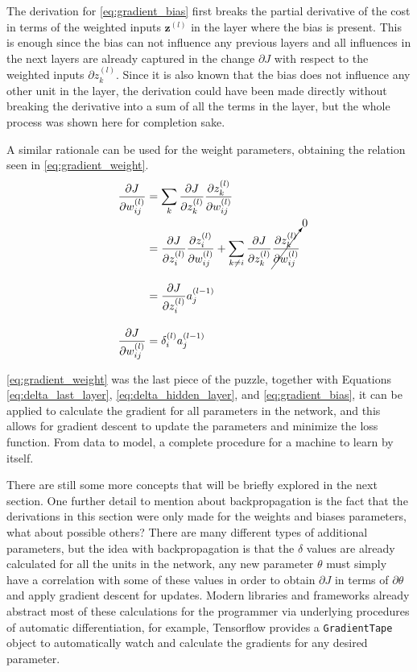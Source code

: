 The derivation for \autoref{eq:gradient_bias} first breaks the partial derivative of the cost in terms of the weighted inputs $\bm{z}^{(l)}$ in the layer where the bias is present. This is enough since the bias can not influence any previous layers and all influences in the next layers are already captured in the change $\partial J$ with respect to the weighted inputs $\partial z_k^{(l)}$. Since it is also known that the bias does not influence any other unit in the layer, the derivation could have been made directly without breaking the derivative into a sum of all the terms in the layer, but the whole process was shown here for completion sake.

A similar rationale can be used for the weight parameters, obtaining the relation seen in \autoref{eq:gradient_weight}.
\begin{align}
    \frac{\partial J}{\partial w_{ij}^{(l)}} &= \sum_{k}{
        \frac{\partial J}{\partial z_k^{(l)}}
        \frac{\partial z_k^{(l)}}{\partial w_{ij}^{(l)}}
    } \nonumber \\
    &= \frac{\partial J}{\partial z_i^{(l)}} \frac{\partial z_i^{(l)}}{\partial w_{ij}^{(l)}} + 
    \sum_{k \neq i}{
        \frac{\partial J}{\partial z_k^{(l)}}
        \cancelto{0}{\frac{\partial z_k^{(l)}}{\partial w_{ij}^{(l)}}}
    } \nonumber \\[10pt]
    &= \frac{\partial J}{\partial z_i^{(l)}} a_{j}^{(l-1)} \nonumber \\[10pt]
    \frac{\partial J}{\partial w_{ij}^{(l)}} &= \delta_{i}^{(l)} a_{j}^{(l-1)} \label{eq:gradient_weight}
\end{align}


\autoref{eq:gradient_weight} was the last piece of the puzzle, together with Equations \ref{eq:delta_last_layer}, \ref{eq:delta_hidden_layer}, and \ref{eq:gradient_bias}, it can be applied to calculate the gradient for all parameters in the network, and this allows for gradient descent to update the parameters and minimize the loss function. From data to model, a complete procedure for a machine to learn by itself.

There are still some more concepts that will be briefly explored in the next section. One further detail to mention about backpropagation is the fact that the derivations in this section were only made for the weights and biases parameters, what about possible others? There are many different types of additional parameters, but the idea with backpropagation is that the $\delta$ values are already calculated for all the units in the network, any new parameter $\theta$ must simply have a correlation with some of these values in order to obtain $\partial J$ in terms of $\partial\theta$ and apply gradient descent for updates. Modern libraries and frameworks already abstract most of these calculations for the programmer via underlying procedures of automatic differentiation, for example, Tensorflow \cite{tensorflow2015} provides a \texttt{GradientTape} object to automatically watch and calculate the gradients for any desired parameter.
